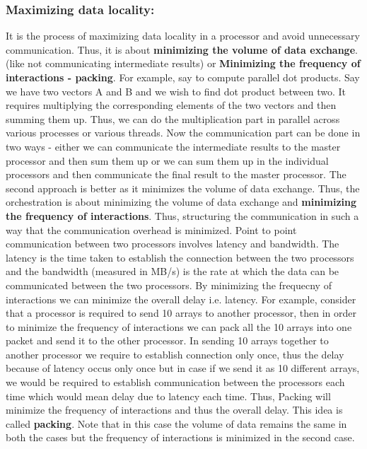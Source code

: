 \documentclass[12pt]{book}
\begin{document}
\subsubsection{Maximizing data locality: }
It is the process of maximizing data locality in a processor and avoid unnecessary communication. Thus, it is about \textbf{minimizing the volume of data exchange}.
(like not communicating intermediate results) or \textbf{Minimizing the frequency of interactions - packing}.
For example, say to compute parallel dot products. Say we have two vectors A and B and we wish to find dot product between two. It requires 
multiplying the corresponding elements of the two vectors and then summing them up. Thus, we can do the multiplication part in parallel across various processes or various threads.
Now the communication part can be done in two ways - either we can communicate the intermediate results to the master processor and then sum them up or we can sum them up in the individual processors and then communicate the final result to the master processor.
The second approach is better as it minimizes the volume of data exchange. Thus, the orchestration is about minimizing the volume of data exchange and \textbf{minimizing the frequency of interactions}. Thus, structuring the communication in such a way that the communication overhead is minimized.
Point to point communication between two processors involves latency and bandwidth. The latency is the time taken to establish the connection between the two processors and the bandwidth (measured in MB/s) is the rate at which the data can be communicated between the two processors. By minimizing the frequecny of interactions we can minimize the overall delay i.e. latency.
For example, consider that a processor is required to send 10 arrays to another processor, then in order to minimize the frequency of interactions 
we can pack all the 10 arrays into one packet and send it to the other processor. In sending 10 arrays together to another processor we require to establish connection only once, thus the delay because of latency
occus only once but in case if we send it as 10 different arrays, we would be required to establish communication between the processors each time which would mean delay due to latency each time. 
Thus, Packing will minimize the frequency of interactions and thus the overall delay. This idea is called 
\textbf{packing}. Note that in this case the volume of data remains the same in both the cases 
but the frequency of interactions is minimized in the second case.
\end{document}
